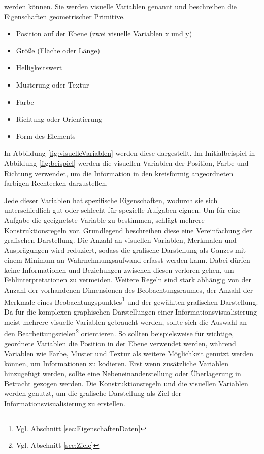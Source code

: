 \documentclass[a4paper, 
               12pt,
               DIV=calc,
               version=first,
               pdftex,
               headsepline,
               footsepline,
               bibtotocnumbered,
               liststotocnumbered]{scrreprt}
\begin{document}
werden können. Sie werden visuelle Variablen genannt und beschreiben die Eigenschaften geometrischer Primitive.
\begin{itemize}
\item Position auf der Ebene (zwei visuelle Variablen x und y)
\item Größe (Fläche oder Länge)
\item Helligkeitswert
\item Musterung oder Textur
\item Farbe
\item Richtung oder Orientierung
\item Form des Elements
\end{itemize}
In Abbildung \ref{fig:visuelleVariablen} werden diese dargestellt. Im Initialbeispiel in Abbildung
\ref{fig:beispiel} werden die visuellen Variablen der Position, Farbe und Richtung verwendet,
um die Information in den kreisförmig angeordneten farbigen Rechtecken darzustellen.

Jede dieser Variablen hat spezifische Eigenschaften, wodurch sie sich unterschiedlich gut oder schlecht
für spezielle Aufgaben eignen. Um für eine Aufgabe die geeignetste Variable zu bestimmen, schlägt
\citep{Bertin} mehrere Konstruktionsregeln vor.
Grundlegend beschreiben diese eine Vereinfachung der grafischen Darstellung.
Die Anzahl an visuellen Variablen, Merkmalen und Ausprägungen wird reduziert,
sodass die grafische Darstellung als Ganzes mit einem Minimum an Wahrnehmungsaufwand erfasst werden kann.
Dabei dürfen keine Informationen und Beziehungen zwischen diesen verloren gehen, um Fehlinterpretationen
zu vermeiden. Weitere Regeln sind stark abhängig von der Anzahl
der vorhandenen Dimensionen des Beobachtungsraumes, der Anzahl der Merkmale eines
Beobachtungspunktes\footnote{Vgl. Abschnitt \ref{sec:EigenschaftenDaten}} und der gewählten
grafischen Darstellung. Da für die komplexen graphischen Darstellungen einer 
Informationsvisualisierung meist mehrere visuelle Variablen gebraucht werden, sollte sich die Auswahl
an den Bearbeitungszielen\footnote{Vgl. Abschnitt \ref{sec:Ziele}} orientieren.
So sollten beispielsweise für wichtige, geordnete Variablen die Position in der Ebene verwendet werden,
während Variablen wie Farbe, Muster und Textur als weitere Möglichkeit genutzt werden können, um Informationen zu kodieren.
Erst wenn zusätzliche Variablen hinzugefügt werden, sollte eine Nebeneinanderstellung oder
Überlagerung in Betracht gezogen werden.
Die Konstruktionsregeln und die visuellen Variablen werden genutzt, um
die grafische Darstellung als Ziel der Informationsvisualisierung zu erstellen.
\end{document}
